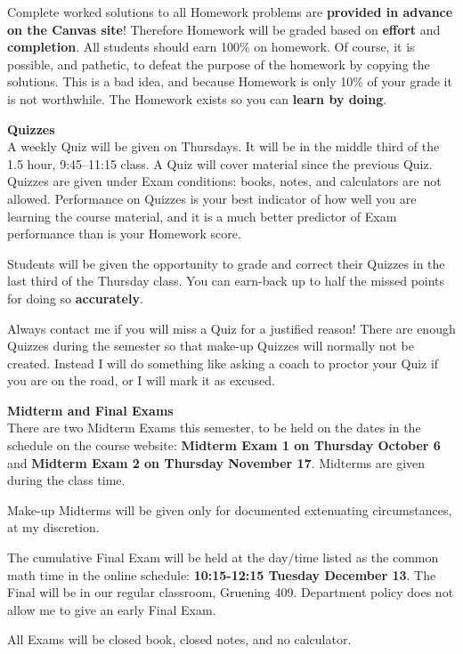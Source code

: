 \documentclass[12pt]{article}
\renewcommand{\emph}[1]{\textsf{\textbf{#1}}}
\newcommand{\localhead}[1]{\par\smallskip\textbf{#1} \smallskip\nobreak\\}%
\def\heading#1{\localhead{\large\emph{#1}}}
\begin{document}
Complete worked solutions to all Homework problems are \emph{provided in advance on the Canvas site}!  Therefore Homework will be graded based on \emph{effort} and \emph{completion}.  All students should earn 100\% on homework.  Of course, it is possible, and pathetic, to defeat the purpose of the homework by copying the solutions.  This is a bad idea, and because Homework is only 10\% of your grade it is not worthwhile.  The Homework exists so you can \emph{learn by doing}.


\heading{Quizzes}
A weekly Quiz will be given on Thursdays.  It will be in the middle third of the 1.5 hour, 9:45--11:15 class.  A Quiz will cover material since the previous Quiz.  Quizzes are given under Exam conditions: books, notes, and calculators are not allowed.  Performance on Quizzes is your best indicator of how well you are learning the course material, and it is a much better predictor of Exam performance than is your Homework score.

Students will be given the opportunity to grade and correct their Quizzes in the last third of the Thursday class.  You can earn-back up to half the missed points for doing so \emph{accurately}.

Always contact me if you will miss a Quiz for a justified reason!  There are enough Quizzes during the semester so that make-up Quizzes will normally not be created.  Instead I will do something like asking a coach to proctor your Quiz if you are on the road, or I will mark it as excused. 


\heading{Midterm and Final Exams}
There are two Midterm Exams this semester, to be held on the dates in the schedule on the course website: \emph{Midterm Exam 1 on Thursday October 6} and \emph{Midterm Exam 2 on Thursday November 17}.  Midterms are given during the class time.

Make-up Midterms will be given only for documented extenuating circumstances, at my discretion.

The cumulative Final Exam will be held at the day/time listed as the common math time in the online schedule: \textbf{10:15-12:15 Tuesday December 13}.  The Final will be in our regular classroom, Gruening 409.  Department policy does not allow me to give an early Final Exam.

All Exams will be closed book, closed notes, and no calculator.
\end{document}
